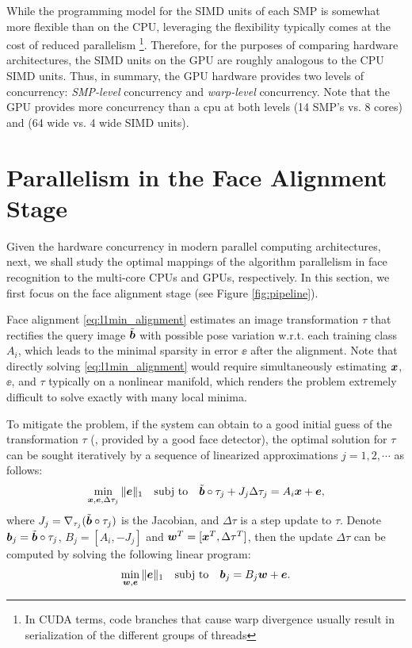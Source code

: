 \documentclass[10pt,twocolumn,letterpaper]{article}
\begin{document}
While the programming model for
the SIMD units of each SMP is somewhat more flexible than on the CPU,
leveraging the flexibility typically comes at the cost of reduced parallelism
\footnote{In CUDA terms, code branches that cause warp divergence usually
result in serialization of the different groups of threads}.  Therefore, for
the purposes of comparing hardware architectures, the SIMD units on the GPU are
roughly analogous to the CPU SIMD units. Thus, in summary, the GPU hardware 
provides two levels of concurrency: {\em SMP-level}
concurrency and {\em warp-level} concurrency.  Note that the GPU provides more
concurrency than a cpu at both levels (14 SMP's vs. 8 cores) and (64 wide vs. 4 wide SIMD
units).

\section{Parallelism in the Face Alignment Stage}
\label{sec:alignment}

Given the hardware concurrency in modern parallel computing architectures, next,
we shall study the optimal mappings of the algorithm parallelism in face recognition to the multi-core CPUs and GPUs, respectively.
In this section, we first focus on the face alignment stage (see Figure \ref{fig:pipeline}).

Face alignment \eqref{eq:l1min_alignment} estimates an image transformation $\tau$ that rectifies the query image $\tilde{{\boldsymbol{b}}}$ with possible pose variation
w.r.t. each training class $A_i$, which leads to the minimal sparsity in error $\ee$ after the alignment. Note that directly solving \eqref{eq:l1min_alignment} would require
simultaneously estimating ${\boldsymbol{x}}$, $\ee$, and $\tau$ typically on a nonlinear manifold, which renders the problem extremely difficult to solve exactly with many local minima.

To mitigate the problem, if the system can obtain to a good initial guess of the transformation $\tau$ (\eg, provided by a good face detector),
the optimal solution for $\tau$ can be sought iteratively by a sequence of linearized approximations $j=1, 2, \cdots$ as follows:
\begin{equation}
\min_{{\boldsymbol{x}}, {\boldsymbol{e}}, \Delta \tau_j}\|{\boldsymbol{e}}\|_1\quad \textup{subj to}\quad \tilde{{\boldsymbol{b}}}\circ\tau_j +  J_j\Delta \tau_j = A_i{\boldsymbol{x}} + {\boldsymbol{e}},
\end{equation}
where $J_j = \nabla_{\tau_j}(\tilde{{\boldsymbol{b}}}\circ\tau_j)$ is the Jacobian, and $\Delta \tau$ is a step update to $\tau$. Denote ${\boldsymbol{b}}_j = \tilde{{\boldsymbol{b}}}\circ\tau_j$, $B_j = [A_i, -J_j]$ and ${\boldsymbol{w}}^T = [{\boldsymbol{x}}^T, \Delta \tau^T]$, then the update $\Delta \tau$ can be computed by solving the following linear program:
\begin{equation}
\min_{{\boldsymbol{w}}, {\boldsymbol{e}}}\|{\boldsymbol{e}}\|_1\quad \textup{subj to}\quad {\boldsymbol{b}}_j = B_j{\boldsymbol{w}} + {\boldsymbol{e}}.
\label{eq:alignment-linearization}
\end{equation}
\end{document}
